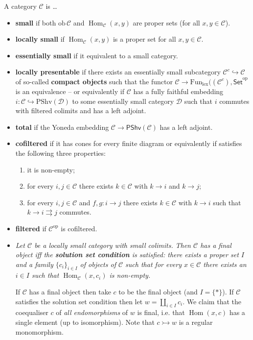 \documentclass[10pt]{article}
\newcommand{\Set}{\mathsf{Set}}
\newcommand{\ccat}{\mathcal{C}}
\newcommand{\dcat}{\mathcal{D}}
\newcommand{\mono}{\rightarrowtail}
\newcommand{\Fun}{\mathrm{Fun}}
\newcommand{\op}[1]{{#1}^\text{op}}
\DeclareMathOperator{\Hom}{Hom}
\begin{document}
        A category $\ccat$ is \ldots
        \begin{itemize}
            \item \textbf{small} if both $\mathrm{ob}\,\ccat$ and $\Hom_\ccat(x,y)$ are proper sets (for all $x,y\in\ccat$).
            \item \textbf{locally small} if $\Hom_\ccat(x,y)$ is a proper set for all $x,y\in\ccat$.
            \item \textbf{essentially small} if it equivalent to a small category.
            \item \textbf{locally presentable} if there exists an essentially small subcategory $\ccat^c\hookrightarrow\ccat$ of so-called \textbf{compact objects} such that the functor $\ccat\to\Fun_\text{lex}(\op{(\ccat^c),\Set}$ is an equivalence -- or equivalently if $\ccat$ has  a fully faithful embedding $i\colon\ccat\hookrightarrow\mathrm{PShv}(\dcat)$ to some essentially small category $\dcat$ such that $i$ commutes with filtered colimits and has a left adjoint.
            \item \textbf{total} if the Yoneda embedding $\ccat\to\mathsf{PShv}(\ccat)$ has a left adjoint.
            \item \textbf{cofiltered} if it has cones for every finite diagram or equivalently if satisfies the following three properties:
                \begin{enumerate}
                    \item it is non-empty;
                    \item for every $i,j\in \ccat$ there exists $k\in \ccat$ with $k\to i$ and $k\to j$;
                    \item for every $i,j\in \ccat$ and $f,g\colon i\to j$ there exists $k\in \ccat$ with $k\to i$ such that $k\to i\rightrightarrows j$ commutes.
                \end{enumerate}
            \item \textbf{filtered} if $\op{\ccat}$ is cofiltered.
            \item \emph{Let $\ccat$ be a locally small category with small colimits.}
                \emph{Then $\ccat$ has a final object iff the \textbf{solution set condition} is satisfied: there exists a proper set $I$ and a family $\{c_i\}_{i\in I}$ of objects of $\ccat$ such that for every $x\in\ccat$ there exists an $i\in I$ such that $\Hom_\ccat(x,c_i)$ is non-empty.}

                If $\ccat$ has a final object then take $c$ to be the final object (and $I=\{*\}$).
                If $\ccat$ satisfies the solution set condition then let $w=\coprod_{i\in I}c_i$.
                We claim that the coequaliser $c$ of \emph{all endomorphisms} of $w$ is final, i.e. that $\Hom(x,c)$ has a single element (up to isomorphism).
                Note that $c\mono w$ is a regular monomorphism.
        \end{itemize}
\end{document}
